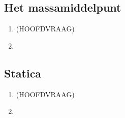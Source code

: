 \documentclass[a4paper,12pt]{article}
\begin{document}
    \subsection{Het massamiddelpunt}
    \begin{enumerate}
        \item \textbf{} (HOOFDVRAAG)
        \item 
    \end{enumerate}
    \subsection{Statica}
    \begin{enumerate}
        \item \textbf{} (HOOFDVRAAG)
        \item                                                                                                                                                                                   
    \end{enumerate}
\end{document}
